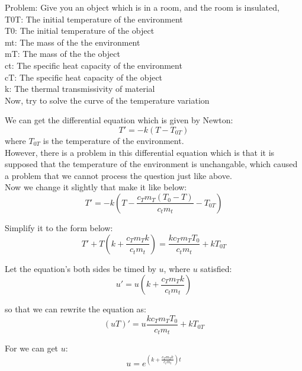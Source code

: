 \documentclass{article}
\begin{document}
Problem: Give you an object which is in a room, and the room is insulated,\\
T0T: The initial temperature of the environment\\
T0: The initial temperature of the object\\
mt: The mass of the the environment\\
mT: The mass of the the object\\
ct: The specific heat capacity of the environment\\
cT: The specific heat capacity of the object\\
k: The thermal transmissivity of material\\
Now, try to solve the curve of the temperature variation

\newpage
We can get the differential equation which is given by Newton: 
\begin{equation}
T' = -k(T - T_{0T})
\end{equation}
where $T_{0T}$ is the temperature of the environment. \\

However, there is a problem in this differential equation which is that it is supposed that the temperature of the environment is unchangable,
which caused a problem that we cannot process the question just like above.\\
Now we change it slightly that make it like below:
\begin{equation}
T' = -k(T - \frac{c_T m_T (T_0 - T)}{c_t m_t} - T_{0T})
\end{equation}

Simplify it to the form below:
\begin{equation}
T' + T(k + \frac{c_T m_T k}{c_t m_t}) = \frac{k c_T m_T T_0}{c_t m_t} + k T_{0T}
\end{equation}

Let the equation's both sides be timed by $u$, where $u$ satisfied:
\begin{equation}
u' = u(k + \frac{c_T m_T k}{c_t m_t})
\end{equation}

so that we can rewrite the equation as:
\begin{equation}
(uT)' = u\frac{k c_T m_T T_0}{c_t m_t} + k T_{0T}
\end{equation}

For we can get $u$:
\begin{equation}
u = e^{(k + \frac{c_T m_T k}{c_t m_t})t}
\end{equation}
\end{document}
